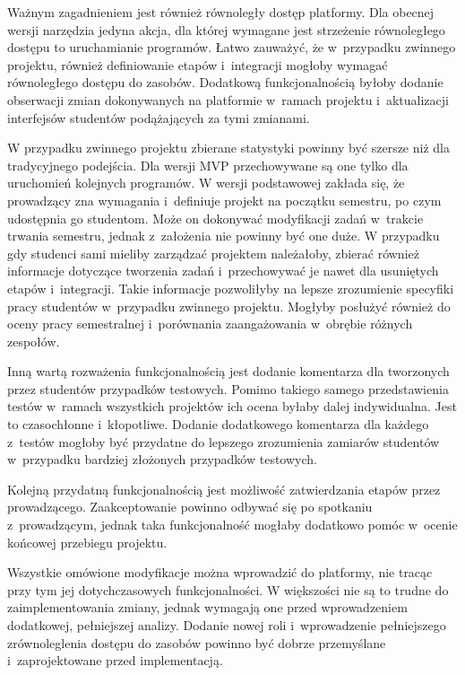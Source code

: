 Ważnym zagadnieniem jest również równoległy dostęp platformy.
Dla obecnej wersji narzędzia jedyna akcja, dla której wymagane jest strzeżenie równoległego dostępu to uruchamianie programów.
Łatwo zauważyć, że w~przypadku zwinnego projektu, również definiowanie etapów i~integracji mogłoby wymagać równoległego dostępu do zasobów.
Dodatkową funkcjonalnością byłoby dodanie obserwacji zmian dokonywanych na platformie w~ramach projektu i~aktualizacji interfejsów studentów podążających za tymi zmianami.

W przypadku zwinnego projektu zbierane statystyki powinny być szersze niż dla tradycyjnego podejścia.
Dla wersji MVP przechowywane są one tylko dla uruchomień kolejnych programów.
W wersji podstawowej zakłada się, że prowadzący zna wymagania i~definiuje projekt na początku semestru, po czym udostępnia go studentom.
Może on dokonywać modyfikacji zadań w~trakcie trwania semestru, jednak z~założenia nie powinny być one duże.
W przypadku gdy studenci sami mieliby zarządzać projektem należałoby, zbierać również informacje dotyczące tworzenia zadań i~przechowywać je nawet dla usuniętych etapów i~integracji.
Takie informacje pozwoliłyby na lepsze zrozumienie specyfiki pracy studentów w~przypadku zwinnego projektu.
Mogłyby posłużyć również do oceny pracy semestralnej i~porównania zaangażowania w~obrębie różnych zespołów.

Inną wartą rozważenia funkcjonalnością jest dodanie komentarza dla tworzonych przez studentów przypadków testowych.
Pomimo takiego samego przedstawienia testów w~ramach wszystkich projektów ich ocena byłaby dalej indywidualna.
Jest to czasochłonne i~kłopotliwe.
Dodanie dodatkowego komentarza dla każdego z~testów mogłoby być przydatne do lepszego zrozumienia zamiarów studentów w~przypadku bardziej złożonych przypadków testowych.

Kolejną przydatną funkcjonalnością jest możliwość zatwierdzania etapów przez prowadzącego.
Zaakceptowanie powinno odbywać się po spotkaniu z~prowadzącym, jednak taka funkcjonalność mogłaby dodatkowo pomóc w~ocenie końcowej przebiegu projektu.

Wszystkie omówione modyfikacje można wprowadzić do platformy, nie tracąc przy tym jej dotychczasowych funkcjonalności.
W większości nie są to trudne do zaimplementowania zmiany, jednak wymagają one przed wprowadzeniem dodatkowej, pełniejszej analizy.
Dodanie nowej roli i~wprowadzenie pełniejszego zrównoleglenia dostępu do zasobów powinno być dobrze przemyślane i~zaprojektowane przed implementacją.

